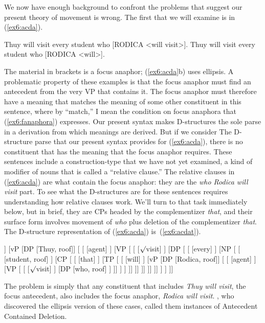 We now have enough background to confront the problems that suggest our present theory of movement is wrong. The first that we will examine is in (\ref{ex6:acda}).
\begin{exe}
	\raggedright
	\ex \label{ex6:acda}
	\begin{xlist}
		\ex Thuy will visit every student who [RODICA <will visit>].
		\ex Thuy will visit every student who [RODICA <will>].
	\end{xlist}
\end{exe}
The material in brackets is a focus anaphor; (\ref{ex6:acda}b) uses ellipsis. A problematic property of these examples is that the focus anaphor must find an antecedent from the very VP that contains it. The focus anaphor must therefore have a meaning that matches the meaning of some other constituent in this sentence, where by ``match,'' I mean the condition on focus anaphora that (\ref{ex6:fanaphora}) expresses. Our present syntax makes D-structures the sole parse in a derivation from which meanings are derived. But if we consider The D-structure parse that our present syntax provides for (\ref{ex6:acda}), there is no constituent that has the meaning that the focus anaphor requires. These sentences include a construction-type that we have not yet examined, a kind of modifier of nouns that is called a ``relative clause.'' The relative clauses in (\ref{ex6:acda}) are what contain the focus anaphor: they are the \emph{who Rodica will visit} part. To see what the D-structures are for these sentences requires understanding how relative clauses work. We'll turn to that task immediately below, but in brief, they are CPs headed by the complementizer \emph{that}, and their surface form involves movement of \emph{who} plus deletion of the complementizer \emph{that}. The D-structure representation of (\ref{ex6:acda}) is~(\ref{ex6:acdat}).
\begin{exe}
	\raggedright
	\ex \label{ex6:acdat}
	\footnotesize
\begin{forest}
[TP [\ibar{T}
	[\obar{T} [will] ]
	[vP 
		[DP [Thuy, roof]]
		[ 
			[ ]
			[VP [ 
				[ [$\surd$visit] ]
				[DP [
					[ [every] ]
					[NP [
						[ [student, roof] ]
						[CP [ 
							[ [that] ]
							[TP [
								[ [will] ]
								[vP 
									[DP [Rodica, roof]]
									[ 
										[ [agent] ]
										[VP [
											[ [$\surd$visit] ]
											[DP [who, roof] ]
										]]
									]
								]
							]]
						]]
					]]
				]]
			]]
		 ]
	]
]]
\end{forest}
\end{exe}
The problem is simply that any constituent that includes \emph{Thuy will visit}, the focus antecedent, also includes the focus anaphor, \emph{Rodica will visit}. \citet{Bouton:1970}, who discovered the ellipsis version of these cases, called them instances of Antecedent Contained Deletion.

